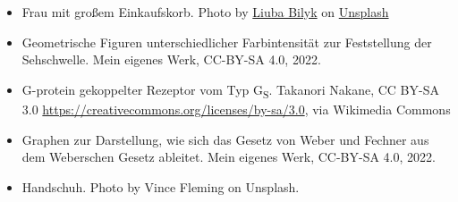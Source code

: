 \documentclass[aspectratio=169]{beamer}
\begin{document}
\begin{frame}
\begin{tiny}
\begin{itemize}
\item 
Frau mit großem Einkaufskorb. Photo by \href{https://unsplash.com/@ibilyk?utm_source=unsplash&utm_medium=referral&utm_content=creditCopyText}{Liuba Bilyk} on \href{https://unsplash.com/s/photos/carrying-groceries?utm_source=unsplash&utm_medium=referral&utm_content=creditCopyText}{Unsplash}
  
  \item
  Geometrische Figuren unterschiedlicher Farbintensität zur Feststellung der Sehschwelle. Mein eigenes Werk, CC-BY-SA 4.0, 2022.
  
  \item
  G-protein gekoppelter Rezeptor vom Typ G\textsubscript{S}. Takanori Nakane, CC BY-SA 3.0 \url{https://creativecommons.org/licenses/by-sa/3.0}, via Wikimedia Commons
 
 \item
 Graphen zur Darstellung, wie sich das Gesetz von Weber und Fechner aus dem Weberschen Gesetz ableitet. Mein eigenes Werk, CC-BY-SA 4.0, 2022. 
 
\item
Handschuh. Photo by Vince Fleming on Unsplash. 
  \end{itemize}
\end{tiny}
\end{frame}
\end{document}
